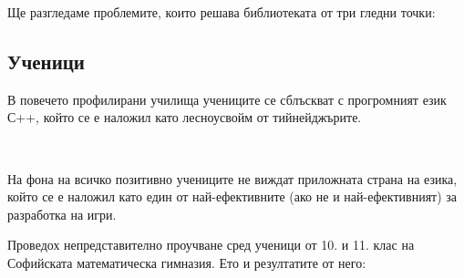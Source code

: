 \documentclass[documentation.tex]{subfiles}
\begin{document}
    Ще разгледаме проблемите, които решава библиотеката от три гледни точки:
    \subsection{Ученици}
    \begin{text} \par
        В повечето профилирани училища учениците се сблъскват с прогромният език С++, който се е наложил като лесноусвойм от тийнейджърите.
    \end{text} \\
    \begin{text} \par
        На фона на всичко позитивно учениците не виждат приложната страна на езика, който се е наложил като един от най-ефективните (ако не и най-ефективният) за разработка на игри.
    \end{text}
    \begin{text} \par
        Проведох непредставително проучване сред ученици от 10. и 11. клас на Софийската математическа гимназия.\cite{form} Ето и резултатите от него:\\
    \end{text}
\end{document}
